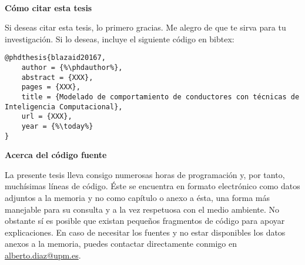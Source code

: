 \cleardoublepage
\begin{fullwidth}
~\vfill
\thispagestyle{empty}
\setlength{\parindent}{0pt}
\setlength{\parskip}{\baselineskip}

\par{
	\textbf{Cómo citar esta tesis}
	
	Si deseas citar esta tesis, lo primero gracias. Me alegro de que te sirva para tu investigación. Si lo deseas, incluye el siguiente código en bibtex:
	
	\begin{lstlisting}[escapechar=\%]
@phdthesis{blazaid20167,
	author = {%\phdauthor%},
	abstract = {XXX},
	pages = {XXX},
	title = {Modelado de comportamiento de conductores con técnicas de Inteligencia Computacional},
	url = {XXX},
	year = {%\today%}
}
	\end{lstlisting}
}

\par{
	\textbf{Acerca del código fuente}
	
	La presente tesis lleva consigo numerosas horas de programación y, por tanto, muchísimas líneas de código. Éste se encuentra en formato electrónico como datos adjuntos a la memoria y no como capítulo o anexo a ésta, una forma más manejable para su consulta y a la vez respetuosa con el medio ambiente. No obstante sí es posible que existan pequeños fragmentos de código para apoyar explicaciones. En caso de necesitar los fuentes y no estar disponibles los datos anexos a la memoria, puedes contactar directamente conmigo en \url{alberto.diaz@upm.es}.
}

\end{fullwidth}


